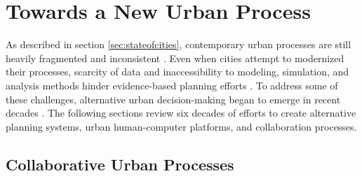 
\section{Towards a New Urban Process}

 {
  As described in section \eqref{sec:stateofcities}, contemporary urban processes are still heavily fragmented and inconsistent \cite{branch1978critical, banerjee2011companion, Ben-Joseph2004}. Even when cities attempt to modernized their processes, scarcity of data and inaccessibility to modeling, simulation, and analysis methods hinder evidence-based planning efforts \cite{UnitedNationsHabitatIII2017, banerjee2011companion}. To address some of these challenges, alternative urban decision-making began to emerge in recent decades \cite{ben-joseph2001, Ishii2002, banerjee2011companion, Snyder2003, mueller2018citizen}. The following sections review six decades of efforts to create alternative planning systems, urban human-computer platforms, and collaboration processes.
 }

\subsection{Collaborative Urban Processes}

